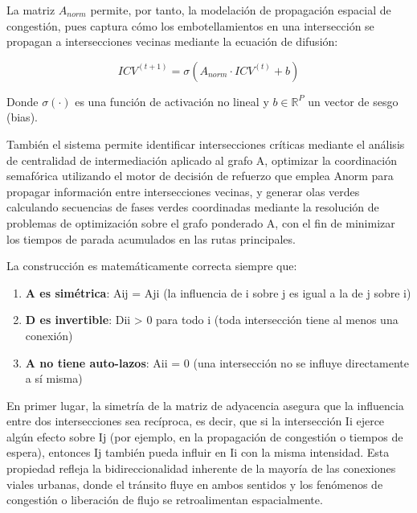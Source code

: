 \documentclass[12pt,a4paper,oneside]{report}
\begin{document}
La matriz \(A_{norm}\) permite, por tanto, la modelación de propagación espacial de congestión, pues captura cómo los embotellamientos en una intersección se propagan a intersecciones vecinas mediante la ecuación de difusión:

\begin{equation}
ICV^{(t + 1)} = \sigma\!\left(A_{norm} \cdot ICV^{(t)} + b\right)
\label{eq:difusion}
\end{equation}

Donde \(\sigma(\cdot)\) es una función de activación no lineal y \(b \in \mathbb{R}^{P}\) un vector de sesgo (bias).

También el sistema permite identificar intersecciones críticas mediante el análisis de centralidad de intermediación aplicado al grafo A, optimizar la coordinación semafórica utilizando el motor de decisión de refuerzo que emplea Anorm para propagar información entre intersecciones vecinas, y generar olas verdes calculando secuencias de fases verdes coordinadas mediante la resolución de problemas de optimización sobre el grafo ponderado A, con el fin de minimizar los tiempos de parada acumulados en las rutas principales.

La construcción es matemáticamente correcta siempre que:

\begin{enumerate}
\def\labelenumi{\arabic{enumi}.}
\item
  \textbf{A es simétrica}: Aij = Aji (la influencia de i sobre j es igual a la de j sobre i)
\item
  \textbf{D es invertible}: Dii \textgreater{} 0 para todo i (toda intersección tiene al menos una conexión)
\item
  \textbf{A no tiene auto-lazos}: Aii = 0 (una intersección no se influye directamente a sí misma)
\end{enumerate}

En primer lugar, la simetría de la matriz de adyacencia asegura que la influencia entre dos intersecciones sea recíproca, es decir, que si la intersección Ii\hspace{0pt} ejerce algún efecto sobre Ij\hspace{0pt} (por ejemplo, en la propagación de congestión o tiempos de espera), entonces Ij\hspace{0pt} también pueda influir en Ii\hspace{0pt} con la misma intensidad. Esta propiedad refleja la bidireccionalidad inherente de la mayoría de las conexiones viales urbanas, donde el tránsito fluye en ambos sentidos y los fenómenos de congestión o liberación de flujo se retroalimentan espacialmente.
\end{document}
